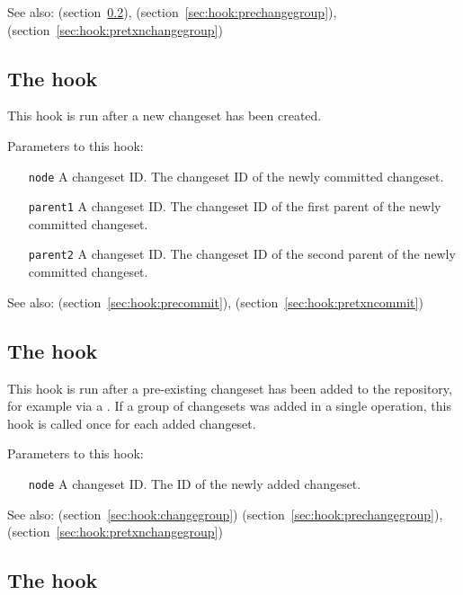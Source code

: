See also:  (section~\ref{sec:hook:incoming}),
 (section~\ref{sec:hook:prechangegroup}),
 (section~\ref{sec:hook:pretxnchangegroup})

\subsection{The  hook}
\label{sec:hook:commit}

This hook is run after a new changeset has been created.

Parameters to this hook:
\begin{itemize}
\item[\texttt{node}] A changeset ID.  The changeset ID of the newly
  committed changeset.
\item[\texttt{parent1}] A changeset ID.  The changeset ID of the first
  parent of the newly committed changeset.
\item[\texttt{parent2}] A changeset ID.  The changeset ID of the second
  parent of the newly committed changeset.
\end{itemize}

See also:  (section~\ref{sec:hook:precommit}),
 (section~\ref{sec:hook:pretxncommit})

\subsection{The  hook}
\label{sec:hook:incoming}

This hook is run after a pre-existing changeset has been added to the
repository, for example via a .  If a group of changesets
was added in a single operation, this hook is called once for each
added changeset.

Parameters to this hook:
\begin{itemize}
\item[\texttt{node}] A changeset ID.  The ID of the newly added
  changeset.
\end{itemize}

See also:  (section~\ref{sec:hook:changegroup})  (section~\ref{sec:hook:prechangegroup}),  (section~\ref{sec:hook:pretxnchangegroup})

\subsection{The  hook}
\label{sec:hook:outgoing}

